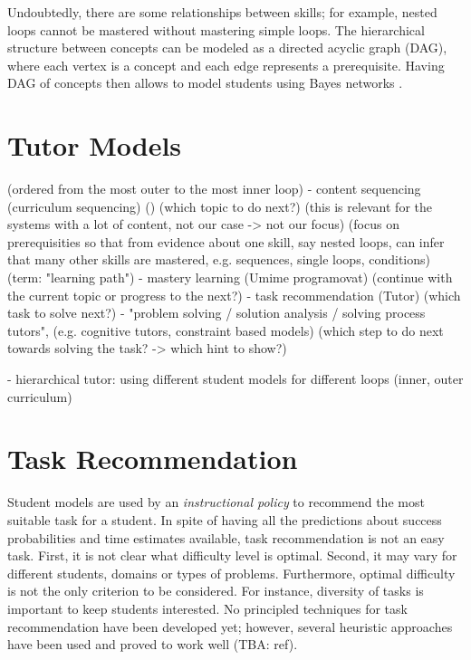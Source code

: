 Undoubtedly, there are some relationships between skills;
  for example, nested loops cannot be mastered without mastering simple loops.
The hierarchical structure between concepts can be modeled
  as a directed acyclic graph (DAG),
  where each vertex is a concept and each edge represents a prerequisite.
Having DAG of concepts then allows to model students using Bayes networks
  \cite{its-programming}.



\section{Tutor Models}

(ordered from the most outer to the most inner loop)
- content sequencing (curriculum sequencing) (\cite{its-programming}) (which topic to do next?)
  (this is relevant for the systems with a lot of content, not our case -> not our focus)
  (focus on prerequisities so that from evidence about one skill, say nested loops, can
  infer that many other skills are mastered, e.g. sequences, single loops, conditions)
  (term: "learning path")
- mastery learning (Umime programovat) (continue with the current topic or progress to the next?)
- task recommendation (Tutor) (which task to solve next?)
- "problem solving / solution analysis / solving process tutors",
  (e.g. cognitive tutors, constraint based models)
  (which step to do next towards solving the task? -> which hint to show?)

- hierarchical tutor: using different student models for different loops
  (inner, outer curriculum)

\section{Task Recommendation}
\label{sec:task-recommendation}

Student models are used by an \emph{instructional policy} to recommend
  the most suitable task for a student.
In spite of having all the predictions about success probabilities
  and time estimates available,
  task recommendation is not an easy task.
First, it is not clear what difficulty level is optimal.  %
Second, it may vary for different students, domains or types of problems.
Furthermore, optimal difficulty is not the only criterion to be considered.
For instance, diversity of tasks is important to keep students interested.
No principled techniques for task recommendation have been developed yet;
however, several heuristic approaches have been used
  and proved to work well (TBA: ref).

